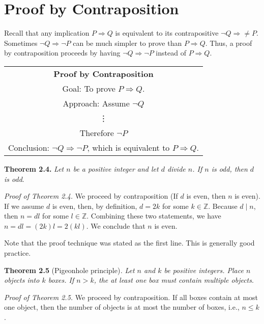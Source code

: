 \documentclass[12pt,a4paper]{article}
\begin{document}
\newpage

\section*{Proof by Contraposition}

Recall that any implication $P\Rightarrow Q$ is equivalent to its contrapositive $\neg Q\Rightarrow\neq P$. Sometimes $\neg Q\Rightarrow \neg P$ can be much simpler to prove than $P\Rightarrow Q$. Thus, a proof by contraposition proceeds by having $\neg Q\Rightarrow \neg P$ instead of $P \Rightarrow Q$.

\begin{center}
\begin{tabular}{|c|}
\hline 
\textbf{Proof by Contraposition} \\ 
Goal: To prove $P\Rightarrow Q$. \\ 
Approach: Assume $\neg Q$ \\ 
\vdots \\ 
Therefore $\neg P$ \\ 
Conclusion: $\neg Q\Rightarrow\neg P$, which is equivalent to $P\Rightarrow Q$. \\ 
\hline 
\end{tabular} 
\end{center}

\textbf{Theorem 2.4.} \textit{Let $n$ be a positive integer and let $d$ divide $n$. If $n$ is odd, then $d$ is odd}.

\bigbreak

\textit{Proof of Theorem 2.4.} We proceed by contraposition (If $d$ is even, then $n$ is even). If we assume $d$ is even, then, by definition, $d=2k$ for some $k\in\mathbb{Z}$. Because $d\mid n$, then $n=dl$ for some $l\in\mathbb{Z}$. Combining these two statements, we have $n=dl=(2k)l=2(kl)$. We conclude that $n$ is even.

\bigbreak

Note that the proof technique was stated as the first line. This is generally good practice.

\bigbreak

\textbf{Theorem 2.5} (Pigeonhole principle)\textit{.} \textit{Let $n$ and $k$ be positive integers. Place $n$ objects into $k$ boxes. If $n>k$, the at least one box must contain multiple objects}.

\bigbreak

\textit{Proof of Theorem 2.5.} We proceed by contraposition. If all boxes contain at most one object, then the number of objects is at most the number of boxes, i.e., $n\leq k$.
\end{document}
